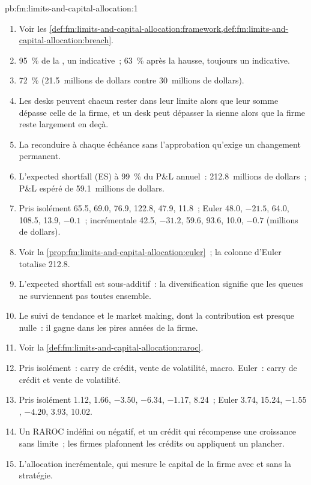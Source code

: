 \begin{solution}{pb:fm:limits-and-capital-allocation:1}
\begin{enumerate}
\item Voir les \cref{def:fm:limits-and-capital-allocation:framework,def:fm:limits-and-capital-allocation:breach}.
\item 95~\% de la , un  indicative~; 63~\% après la hausse, toujours un  indicative.
\item 72~\% (21.5~millions de dollars contre 30~millions de dollars).
\item Les desks peuvent chacun rester dans leur limite alors que leur somme dépasse celle de la firme, et un desk peut dépasser la sienne alors que la firme reste largement en deçà.
\item La reconduire à chaque échéance sans l'approbation qu'exige un changement permanent.
\item L'expected shortfall (ES) à 99~\% du P\&L annuel~: 212.8~millions de dollars~; P\&L espéré de 59.1~millions de dollars.
\item Pris isolément 65.5, 69.0, 76.9, 122.8, 47.9, 11.8~; Euler 48.0, $-21.5$, 64.0, 108.5, 13.9, $-0.1$~; incrémentale 42.5, $-31.2$, 59.6, 93.6, 10.0,
$-0.7$ (millions de dollars).
\item Voir la \cref{prop:fm:limits-and-capital-allocation:euler}~; la colonne d'Euler totalise 212.8.
\item L'expected shortfall est sous-additif~: la diversification signifie que les queues ne surviennent pas toutes ensemble.
\item Le suivi de tendance et le market making, dont la contribution est presque nulle~: il gagne dans les pires années de la firme.
\item Voir la \cref{def:fm:limits-and-capital-allocation:raroc}.
\item Pris isolément~: carry de crédit, vente de volatilité, macro. Euler~: carry de crédit et vente de volatilité.
\item Pris isolément 1.12, 1.66, $-3.50$, $-6.34$, $-1.17$, 8.24~; Euler 3.74, 15.24, $-1.55$, $-4.20$, 3.93, 10.02.
\item Un RAROC indéfini ou négatif, et un crédit qui récompense une croissance sans limite~; les firmes plafonnent les crédits ou appliquent un plancher.
\item L'allocation incrémentale, qui mesure le capital de la firme avec et sans la stratégie.

\end{enumerate}
\end{solution}
